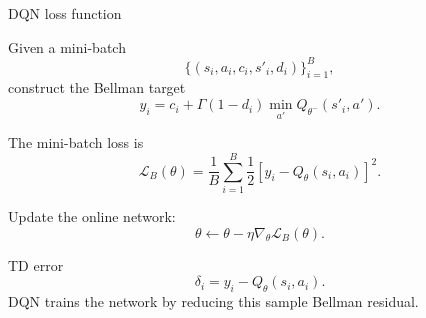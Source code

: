 \documentclass[aspectratio=169]{beamer}
\begin{document}
\begin{frame}{DQN loss function}

\small
Given a mini-batch
\[
\{(s_i,a_i,c_i,s'_i,d_i)\}_{i=1}^{B},
\]
construct the Bellman target
\[
y_i=c_i+\Gamma(1-d_i)\min_{a'}Q_{\theta^-}(s'_i,a').
\]

\vspace{-0.1cm}

The mini-batch loss is
\[
\mathcal L_B(\theta)=
\frac{1}{B}\sum_{i=1}^{B}
\frac12\left[y_i-Q_\theta(s_i,a_i)\right]^2.
\]

\vspace{-0.1cm}

Update the online network:
\[
\theta\leftarrow\theta-\eta\nabla_\theta \mathcal L_B(\theta).
\]

\vspace{-0.05cm}

\begin{block}{TD error}
\small
\[
\delta_i=y_i-Q_\theta(s_i,a_i).
\]
DQN trains the network by reducing this sample Bellman residual.
\end{block}

\end{frame}
\end{document}
